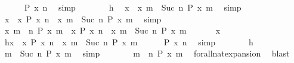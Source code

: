 \begin{isabellebody}
\ \ \ \ \isamarkupfalse%
\ {\isacartoucheopen}P\ x\ n{\isacartoucheclose}\ \isamarkupfalse%
\ simp\isanewline
\ \ \ \ \isamarkupfalse%
\ \isamarkupfalse%
\ h\ \isamarkupfalse%
\ {\isacartoucheopen}x\ {\isasymin}\ {\isacharbraceleft}x{\isachardot}\ {\isasymforall}m\ {\isasymge}\ Suc\ n{\isachardot}\ P\ x\ m{\isacharbraceright}{\isacartoucheclose}\ \isamarkupfalse%
\ simp\isanewline
\ \ \ \ \isamarkupfalse%
\ \isamarkupfalse%
\ {\isacartoucheopen}x\ {\isasymin}\ {\isacharbraceleft}x{\isachardot}\ P\ x\ n{\isacharbraceright}\ {\isasyminter}\ {\isacharbraceleft}x{\isachardot}\ {\isasymforall}m\ {\isasymge}\ Suc\ n{\isachardot}\ P\ x\ m{\isacharbraceright}{\isacartoucheclose}\ \isamarkupfalse%
\ simp\isanewline
\ \ \isacommand{{\isacharbraceright}}\isamarkupfalse%
\ \isamarkupfalse%
\ {\isacartoucheopen}{\isacharbraceleft}x{\isachardot}\ {\isasymforall}m\ {\isasymge}\ n{\isachardot}\ P\ x\ m{\isacharbraceright}\ {\isasymsubseteq}\ {\isacharbraceleft}x{\isachardot}\ P\ x\ n{\isacharbraceright}\ {\isasyminter}\ {\isacharbraceleft}x{\isachardot}\ {\isasymforall}m\ {\isasymge}\ Suc\ n{\isachardot}\ P\ x\ m{\isacharbraceright}{\isacartoucheclose}\ \isacommand{{\isachardot}{\isachardot}}\isamarkupfalse%
\isanewline
{}\isamarkupfalse%
\isanewline
\ \ \isacommand{{\isacharbraceleft}}\isamarkupfalse%
\ \isamarkupfalse%
\ x\isanewline
\ \ \ \ \isamarkupfalse%
\ h{\isacharcolon}{\isacartoucheopen}x\ {\isasymin}\ {\isacharbraceleft}x{\isachardot}\ P\ x\ n{\isacharbraceright}\ {\isasyminter}\ {\isacharbraceleft}x{\isachardot}\ {\isasymforall}m\ {\isasymge}\ Suc\ n{\isachardot}\ P\ x\ m{\isacharbraceright}{\isacartoucheclose}\isanewline
\ \ \ \ \isamarkupfalse%
\ {\isacartoucheopen}P\ x\ n{\isacartoucheclose}\ \isamarkupfalse%
\ simp\isanewline
\ \ \ \ \isamarkupfalse%
\ \isamarkupfalse%
\ h\ \isamarkupfalse%
\ {\isacartoucheopen}{\isasymforall}m\ {\isasymge}\ Suc\ n{\isachardot}\ P\ x\ m{\isacartoucheclose}\ \isamarkupfalse%
\ simp\isanewline
\ \ \ \ \isamarkupfalse%
\ \isamarkupfalse%
\ {\isacartoucheopen}{\isasymforall}m\ {\isasymge}\ n{\isachardot}\ P\ x\ m{\isacartoucheclose}\ \isamarkupfalse%
\ forall{\isacharunderscore}nat{\isacharunderscore}expansion\ \isamarkupfalse%
\ blast\isanewline

\end{isabellebody}
